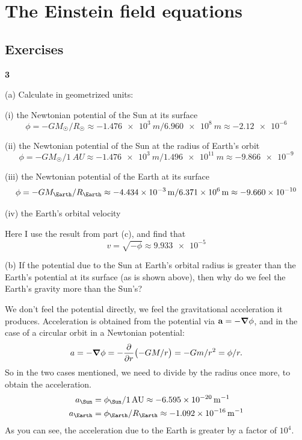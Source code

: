 \documentclass[gr-notes.tex]{subfiles}
\begin{document}
\setcounter{chapter}{7}

\chapter{The Einstein field equations}

\setcounter{section}{5}

\section{Exercises}

\textbf{3}

(a) Calculate in geometrized units:

(i) the Newtonian potential of the Sun at its surface
%
\begin{displaymath}
  \phi =
 -G M_\Sun / R_\Sun \approx
 -\SI{1.476e3}{m} / \SI{6.960e8}{m} \approx
  \num{-2.12e-6}
\end{displaymath}

(ii) the Newtonian potential of the Sun at the radius of Earth's orbit
%
\begin{displaymath}
  \phi =
 -G M_\Sun / \SI{1}{AU} \approx
 -\SI{1.476e3}{m} / \SI{1.496e11}{m} \approx
  \num{-9.866e-9}
\end{displaymath}

(iii) the Newtonian potential of the Earth at its surface
%
\begin{displaymath}
  \phi =
 -G M_\Earth / R_\Earth \approx
 -\SI{4.434e-3}{m} / \SI{6.371e6}{m} \approx
  \num{-9.660e-10}
\end{displaymath}

(iv) the Earth's orbital velocity

Here I use the result from part (c), and find that
%
\begin{displaymath}
  v =
  \sqrt{-\phi} \approx
  \num{9.933e-5}
\end{displaymath}

(b) If the potential due to the Sun at Earth's orbital radius is greater than the Earth's potential at its surface (as is shown above), then why do we feel the Earth's gravity more than the Sun's?

We don't feel the potential directly, we feel the gravitational acceleration it produces. Acceleration is obtained from the potential via $\vb{a} = -\grad\phi$, and in the case of a circular orbit in a Newtonian potential:
%
\begin{displaymath}
  a =
 -\grad\phi =
 -\pdv{r} (-G M / r) =
 -G m / r^2 =
  \phi / r.
\end{displaymath}
%
So in the two cases mentioned, we need to divide by the radius once more, to obtain the acceleration.
%
\begin{align*}
  a_\Sun &=
  \phi_\Sun / \SI{1}{AU} \approx
  \SI{-6.595e-20}{\per\meter}
  \\
  a_\Earth &=
  \phi_\Earth / R_\Earth \approx
  \SI{-1.092e-16}{\per\meter}
\end{align*}
%
As you can see, the acceleration due to the Earth is greater by a factor of $10^4$.
\end{document}
